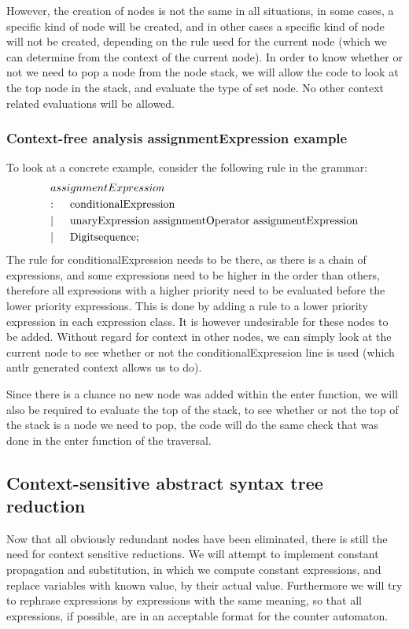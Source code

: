 \documentclass[12pt]{article}
\begin{document}
However, the creation of nodes is not the same in all situations, in some cases, a specific kind of node will be created, and in other cases a specific kind of node will not be created, depending on the rule used for the current node (which we can determine from the context of the current node). In order to know whether or not we need to pop a node from the node stack, we will allow the code to look at the top node in the stack, and evaluate the type of set node. No other context related evaluations will be allowed.

\subsubsection{Context-free analysis assignmentExpression example}
To look at a concrete example, consider the following rule in the grammar:
\begin{align*}
	&assignmentExpression\\
	&\text{:}\indent \text{conditionalExpression}\\
	&|\indent \text{unaryExpression assignmentOperator assignmentExpression}\\
	&|\indent \text{Digitsequence}; \\
\end{align*}
The rule for conditionalExpression needs to be there, as there is a chain of expressions, and some expressions need to be higher in the order than others, therefore all expressions with a higher priority need to be evaluated before the lower priority expressions. This is done by adding a rule to a lower priority expression in each expression class. It is however undesirable for these nodes to be added. Without regard for context in other nodes, we can simply look at the current node to see whether or not the conditionalExpression line is used (which antlr generated context allows us to do).

Since there is a chance no new node was added within the enter function, we will also be required to evaluate the top of the stack, to see whether or not the top of the stack is a node we need to pop, the code will do the same check that was done in the enter function of the traversal.

\subsection{Context-sensitive abstract syntax tree reduction}
Now that all obviously redundant nodes have been eliminated, there is still the need for context sensitive reductions. We will attempt to implement constant propagation and substitution, in which we compute constant expressions, and replace variables with known value, by their actual value. Furthermore we will try to rephrase expressions by expressions with the same meaning, so that all expressions, if possible, are in an acceptable format for the counter automaton.
\end{document}
